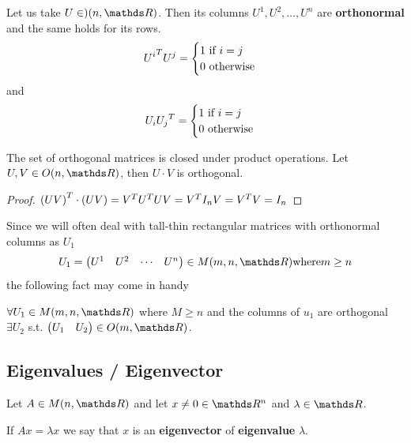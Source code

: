\documentclass[computationalMathematics.tex]{subfiles}
\begin{document}
\begin{proposition}
  Let us take $U \in )(n, \R)$.
  Then its columns $U^1, U^2, \ldots, U^n$ are \textbf{orthonormal} and the same holds for its rows.
  \[
  {U^i}^{T} U^j = \begin{cases}
    1 \text{ if } i=j\\
    0 \text{ otherwise}
  \end{cases}
  \]
  and
  \[
    U_i {U_j}^{T} = \begin{cases}
    1 \text{ if } i=j\\
    0 \text{ otherwise}
  \end{cases}
  \]
\end{proposition}

\begin{proposition}
  The set of orthogonal matrices is closed under product operations.
  Let $U, V \in O(n, \R)$, then $U \cdot V$ is orthogonal.
\end{proposition}

\begin{proof}
  ${(UV)}^{T} \cdot (UV) = {V}^{T} {U}^{T} U V = {V}^{T} I_n V = {V}^{T} V = I_n$
\end{proof}

Since we will often deal with tall-thin rectangular matrices with
orthonormal columns as $U_1$
  \[
    U_1 = \begin{pmatrix} U^1 & U^2 & \cdots & U^n\end{pmatrix} \in M(m, n, \R) \text{where} m \geq n
  \]
the following fact may come in handy

\begin{proposition}
  $\forall U_1 \in M(m, n, \R)$ where $M \ge n$ and the columns of $u_1$ are orthogonal $\exists U_2$ s.t. $\begin{pmatrix} U_1 & U_2 \end{pmatrix} \in O(m, \R)$.
\end{proposition}

\subsection{Eigenvalues / Eigenvector}

\begin{definition}
  Let $A \in M(n, \R)$ and let $x \neq 0 \in \R^n$ and $\lambda \in \R$.

  If $Ax = \lambda x$ we say that $x$ is an \textbf{eigenvector} of \textbf{eigenvalue} $\lambda$.
\end{definition}
\end{document}
